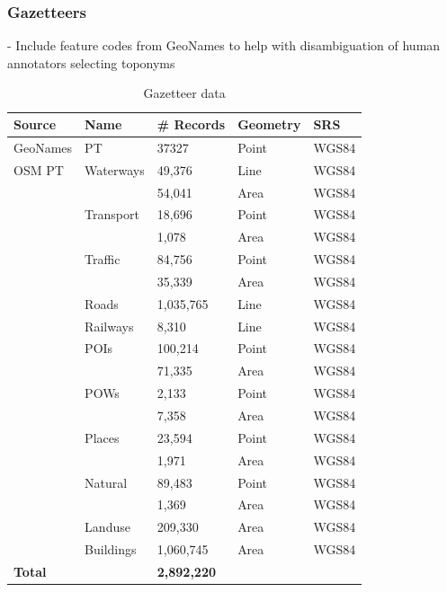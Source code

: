 \subsubsection{Gazetteers}
-{\color{red} Include feature codes from GeoNames to help with disambiguation of human annotators selecting toponyms\cite{Karimzadeh2019}}\\
\begin{table} [H]
		\centering
		\begin{tabular}{| l l l l l |}
			\hline
			Source & Name & \# Records & Geometry & SRS \\ 
			\hline
			\hline
			GeoNames & PT&37327 & Point & WGS84 \\
			\hline
			OSM PT & Waterways & 49,376 & Line & WGS84 \\
			&  & 54,041 & Area & WGS84 \\
			& Transport & 18,696 & Point & WGS84 \\
			& & 1,078 & Area & WGS84 \\
			& Traffic & 84,756 & Point & WGS84 \\
			&  & 35,339 & Area & WGS84 \\
			& Roads & 1,035,765 & Line & WGS84 \\
			& Railways & 8,310 & Line & WGS84 \\
			& POIs & 100,214 & Point & WGS84 \\
			&  & 71,335 & Area & WGS84 \\
			& POWs & 2,133 & Point & WGS84 \\
			&  & 7,358 & Area & WGS84 \\
			& Places & 23,594 & Point & WGS84 \\
			&  & 1,971 & Area & WGS84 \\
			& Natural & 89,483 & Point & WGS84 \\
			&  & 1,369 & Area & WGS84 \\
			& Landuse & 209,330 & Area & WGS84 \\
			& Buildings & 1,060,745 & Area & WGS84 \\
			\hline
			\hline
			\textbf{Total} & & \textbf{2,892,220} & & \\
			\hline
		\end{tabular}
		\caption{Gazetteer data}
		\label{table:data_gazetteer}
\end{table}

